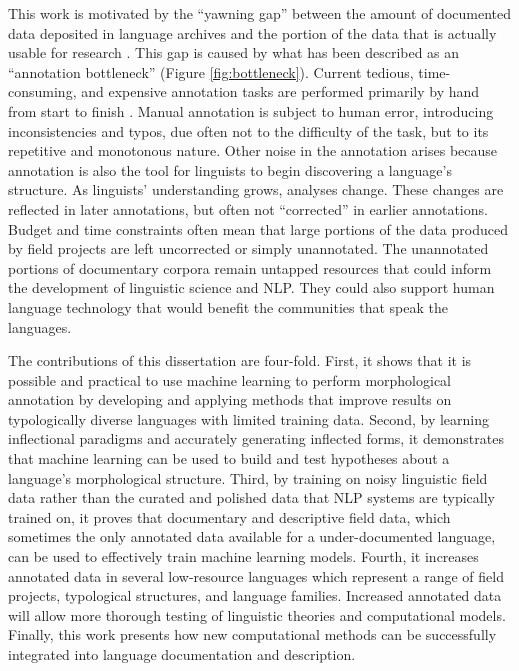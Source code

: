 This work is motivated by the “yawning gap” between the amount of documented data deposited in language archives and the portion of the data that is actually usable for research \citep{seifart_language_2018}. This gap is caused by what has been described as an ``annotation bottleneck'' (Figure \ref{fig:bottleneck}). Current tedious, time-consuming, and expensive annotation tasks are performed primarily by hand from start to finish \citep{simons_worlds_2013,holton_developing_2017}. Manual annotation is subject to human error, introducing inconsistencies and typos, due often not to the difficulty of the task, but to its repetitive and monotonous nature. Other noise in the annotation arises because annotation is also the tool for linguists to begin discovering a language's structure. As linguists' understanding grows, analyses change. These changes are reflected in later annotations, but often not ``corrected'' in earlier annotations.
Budget and time constraints often mean that large portions of the data produced by field projects are left uncorrected or simply unannotated. The unannotated portions of documentary corpora remain untapped resources that could inform the development of linguistic science and NLP. They could also support human language technology that would benefit the communities that speak the languages. 

The contributions of this dissertation are four-fold. First, it shows that it is possible and practical to use machine learning to perform morphological annotation by developing and applying methods that improve results on typologically diverse languages with limited training data. Second, by learning inflectional paradigms and accurately generating inflected forms, it demonstrates that machine learning can be used to build and test hypotheses about a language's morphological structure. Third, by training on noisy linguistic field data rather than the curated and polished data that NLP systems are typically trained on, it proves that documentary and descriptive field data, which sometimes the only annotated data available for a under-documented language, can be used to effectively train machine learning models. 
Fourth, it increases annotated data in several low-resource languages which represent a range of field projects, typological structures, and language families. Increased annotated data will allow more thorough testing of linguistic theories and computational models.
Finally, this work presents how new computational methods can be successfully integrated into language documentation and description. 

